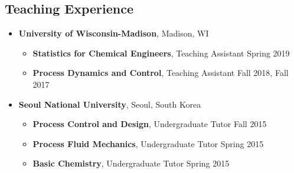 \documentclass[letterpaper, 11pt]{article}
\begin{document}
\subsection*{Teaching Experience}
\begin{itemize}[leftmargin=*]
\item[] {\bf University of Wisconsin-Madison}, Madison, WI
  \begin{itemize}[leftmargin=*,itemsep=0pt]
  \item[] {\bf Statistics for Chemical Engineers}, Teaching Assistant \hfill Spring 2019
  \item[] {\bf Process Dynamics and Control}, Teaching Assistant \hfill  Fall 2018, Fall 2017
  \end{itemize}
\item[] {\bf Seoul National University}, Seoul, South Korea
  \begin{itemize}[leftmargin=*,itemsep=0pt]
  \item[] {\bf Process Control and Design}, Undergraduate Tutor \hfill  Fall 2015
  \item[] {\bf Process Fluid Mechanics}, Undergraduate Tutor \hfill Spring 2015
  \item[] {\bf Basic Chemistry}, Undergraduate Tutor \hfill Spring 2015
  \end{itemize}
\end{itemize}
\end{document}
